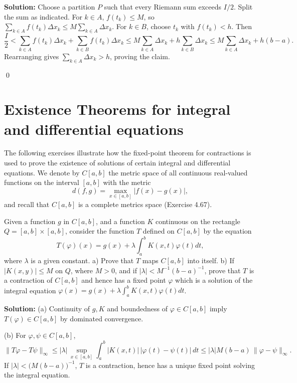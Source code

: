 \noindent\textbf{Solution:}
Choose a partition $P$ such that every Riemann sum exceeds $I/2$. Split the sum as indicated. For $k\in A$, $f(t_k)\le M$, so $\sum_{k\in A} f(t_k)\Delta x_k\le M\sum_{k\in A}\Delta x_k$. For $k\in B$, choose $t_k$ with $f(t_k)<h$. Then
\[\frac{I}{2}<\sum_{k\in A} f(t_k)\Delta x_k+\sum_{k\in B} f(t_k)\Delta x_k\le M\sum_{k\in A}\Delta x_k + h\sum_{k\in B}\Delta x_k\le M\sum_{k\in A}\Delta x_k + h(b-a).
\]
Rearranging gives $\sum_{k\in A}\Delta x_k>h$, proving the claim.


\qed
\section{Existence Theorems for integral and differential equations}
The following exercises illustrate how the fixed-point theorem for contractions is used to prove the existence of solutions of certain integral and differential equations. We denote by $C[a, b]$ the metric space of all continuous real-valued functions on the interval $[a, b]$ with the metric $$d(f, g) = \max_{x \in [a, b]} |f(x) - g(x)|,$$ 
and recall that $C[a,b]$ is a complete metrics space (Exercise 4.67).




\begin{problembox}
Given a function $g$ in $C[a, b]$, and a function $K$ continuous on the rectangle $Q = [a, b] \times [a, b]$, consider the function $T$ defined on $C[a, b]$ by the equation 
\[T(\varphi)(x) = g(x) + \lambda \int_a^b K(x, t)\varphi(t) dt,\]
where $\lambda$ is a given constant.
a) Prove that $T$ maps $C[a, b]$ into itself.
b) If $|K(x, y)| \leq M$ on $Q$, where $M > 0$, and if $|\lambda| < M^{-1}(b - a)^{-1}$, prove that $T$ is a contraction of $C[a, b]$ and hence has a fixed point $\varphi$ which is a solution of the integral equation $\varphi(x) = g(x) + \lambda \int_a^b K(x, t)\varphi(t) dt$.
\end{problembox}

\noindent\textbf{Solution:}
(a) Continuity of $g,K$ and boundedness of $\varphi\in C[a,b]$ imply $T(\varphi)\in C[a,b]$ by dominated convergence.

(b) For $\varphi,\psi\in C[a,b]$,
\[\|T\varphi-T\psi\|_\infty \le |\lambda|\,\sup_{x\in[a,b]}\int_a^b |K(x,t)|\,|\varphi(t)-\psi(t)|\,dt \le |\lambda|M(b-a)\,\|\varphi-\psi\|_\infty.
\]
If $|\lambda|<\big(M(b-a)\big)^{-1}$, $T$ is a contraction, hence has a unique fixed point solving the integral equation.





